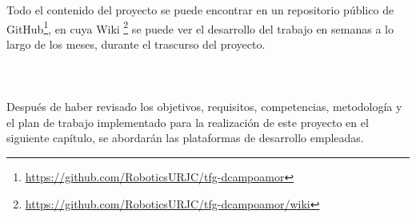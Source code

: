 \pagebreak
Todo el contenido del proyecto se puede encontrar en un repositorio público de GitHub\footnote{\url{https://github.com/RoboticsURJC/tfg-dcampoamor}}, en cuya Wiki \footnote{\url{https://github.com/RoboticsURJC/tfg-dcampoamor/wiki}} se puede ver el desarrollo del trabajo en semanas a lo largo de los meses, durante el trascurso del proyecto.\\
\\
\\
\\
Después de haber revisado los objetivos, requisitos, competencias, metodología y el plan de trabajo implementado para la realización de este proyecto en el siguiente capítulo, se abordarán las plataformas de desarrollo empleadas.

